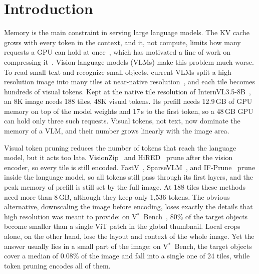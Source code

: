 \section{Introduction}
\label{sec:intro}

Memory is the main constraint in serving large language models. The KV cache grows with every token
in the context, and it, not compute, limits how many requests a GPU can hold at
once~\cite{pagedattention}, which has motivated a line of work on compressing it~\cite{h2o,streamingllm}.
Vision-language models (VLMs) make this problem much worse. To read small text and recognize small
objects, current VLMs split a high-resolution image into many tiles at near-native
resolution~\cite{internvl15,llavanext,internvl35}, and each tile becomes hundreds of visual tokens. Kept at
the native tile resolution of InternVL3.5-8B~\cite{internvl35}, an 8K image needs 188 tiles, \ie 48K
visual tokens. Its prefill
needs 12.9\,GB of GPU memory on top of the model weights and 17\,s to the first token, so a 48\,GB GPU
can hold only three such requests. Visual tokens, not text, now dominate the memory of a VLM, and their
number grows linearly with the image area.

Visual token pruning reduces the number of tokens that reach the language model, but it acts too late.
VisionZip~\cite{visionzip} and HiRED~\cite{hired} prune after the vision encoder, so every tile is still encoded.
FastV~\cite{fastv}, SparseVLM~\cite{sparsevlm}, and IF-Prune~\cite{ifprune} prune inside the language
model, so all tokens still pass through its first layers, and the peak memory of prefill is still set
by the full image. At 188 tiles these methods need more than 8\,GB, although they keep only 1{,}536
tokens. The obvious alternative, downscaling the image before encoding, loses exactly
the details that high resolution was meant to provide: on V$^*$~Bench~\cite{vstar}, 80\% of the target
objects become smaller than a single ViT patch in the global thumbnail. Local crops alone, on the other
hand, lose the layout and context of the whole image. Yet the answer usually lies in a small part of the
image: on V$^*$~Bench, the target objects cover a median of 0.08\% of the image and fall into a single one
of 24 tiles, while token pruning encodes all of them.

